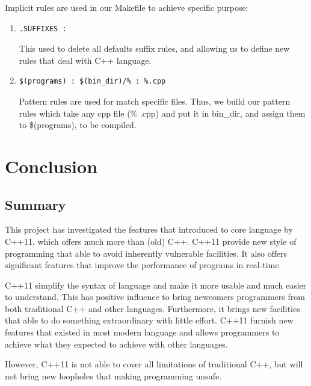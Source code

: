 \documentclass[11pt]{report}
\begin{document}
\begin{enumerate}
\begin{enumerate}
Implicit rules are used in our Makefile to achieve specific purpose:
\begin{enumerate}
\item \begin{verbatim}
.SUFFIXES :
\end{verbatim}
This used to delete all defaults suffix rules, and allowing us to define new rules that deal with C++ language.

\item \begin{verbatim}
$(programs) : $(bin_dir)/% : %.cpp
\end{verbatim}
Pattern rules are used for match specific files. Thus, we build our pattern rules which take any cpp file (\% .cpp) and put it in bin\_dir, and assign them to \$(programs), to be compiled.

\end{enumerate}
\end{enumerate}
\end{enumerate}


\chapter{Conclusion}
\label{chapter: conclusion}

\section{Summary}
\label{se : summary}
This project has investigated the features that introduced to core language by C++11, which offers much more than (old) C++. C++11 provide new style of programming that able to avoid inherently vulnerable facilities. It also offers significant features that improve the performance of programs in real-time.

C++11 simplify the syntax of language and make it more usable and much easier to understand. This has positive influence to bring newcomers programmers from both traditional C++ and other languages. Furthermore, it brings new facilities that able to do something extraordinary with little effort.  C++11 furnish new features that existed in most modern language and allows programmers to achieve what they expected to achieve with other languages.

However, C++11 is not able to cover all limitations of traditional C++, but will not bring new loopholes that making programming unsafe.
\end{document}
